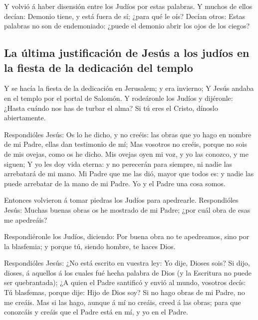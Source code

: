  Y volvió á haber disensión entre los Judíos por estas
palabras.  Y muchos de ellos decían: Demonio tiene, y
está fuera de sí; ¿para qué le oís?  Decían otros: Estas
palabras no son de endemoniado: ¿puede el demonio abrir los ojos de los
ciegos?

\hypertarget{la-uxfaltima-justificaciuxf3n-de-jesuxfas-a-los-juduxedos-en-la-fiesta-de-la-dedicaciuxf3n-del-templo}{%
\subsection{La última justificación de Jesús a los judíos en la fiesta
de la dedicación del
templo}\label{la-uxfaltima-justificaciuxf3n-de-jesuxfas-a-los-juduxedos-en-la-fiesta-de-la-dedicaciuxf3n-del-templo}}

 Y se hacía la fiesta de la dedicación en Jerusalem; y
era invierno;  Y Jesús andaba en el templo por el portal
de Salomón.  Y rodeáronle los Judíos y dijéronle: ¿Hasta
cuándo nos has de turbar el alma? Si tú eres el Cristo, dínoslo
abiertamente.

 Respondióles Jesús: Os lo he dicho, y no creéis: las
obras que yo hago en nombre de mi Padre, ellas dan testimonio de mí;
 Mas vosotros no creéis, porque no sois de mis ovejas,
como os he dicho.  Mis ovejas oyen mi voz, y yo las
conozco, y me siguen;  Y yo les doy vida eterna: y no
perecerán para siempre, ni nadie las arrebatará de mi mano.
 Mi Padre que me las dió, mayor que todos es: y nadie las
puede arrebatar de la mano de mi Padre.  Yo y el Padre
una cosa somos.

 Entonces volvieron á tomar piedras los Judíos para
apedrearle.  Respondióles Jesús: Muchas buenas obras os
he mostrado de mi Padre; ¿por cuál obra de esas me apedreáis?

 Respondiéronle los Judíos, diciendo: Por buena obra no
te apedreamos, sino por la blasfemia; y porque tú, siendo hombre, te
haces Dios.

 Respondióles Jesús: ¿No está escrito en vuestra ley: Yo
dije, Dioses sois?  Si dijo, dioses, á aquellos á los
cuales fué hecha palabra de Dios (y la Escritura no puede ser
quebrantada);  ¿A quien el Padre santificó y envió al
mundo, vosotros decís: Tú blasfemas, porque dije: Hijo de Dios soy?
 Si no hago obras de mi Padre, no me creáis.
 Mas si las hago, aunque á mí no creáis, creed á las
obras; para que conozcáis y creáis que el Padre está en mí, y yo en el
Padre.

